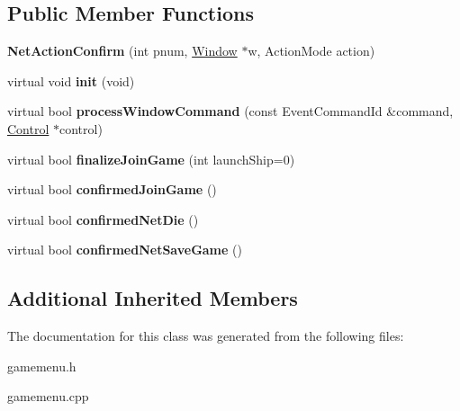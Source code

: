 \subsection*{Public Member Functions}
\begin{DoxyCompactItemize}
\item 
{\bfseries Net\+Action\+Confirm} (int pnum, \hyperlink{classWindow}{Window} $\ast$w, Action\+Mode action)\hypertarget{classNetActionConfirm_ac140d93e689becca599f60c30d4af493}{}\label{classNetActionConfirm_ac140d93e689becca599f60c30d4af493}

\item 
virtual void {\bfseries init} (void)\hypertarget{classNetActionConfirm_aed11586b8722c5949b94a37f154cb768}{}\label{classNetActionConfirm_aed11586b8722c5949b94a37f154cb768}

\item 
virtual bool {\bfseries process\+Window\+Command} (const Event\+Command\+Id \&command, \hyperlink{classControl}{Control} $\ast$control)\hypertarget{classNetActionConfirm_a70d4fcb462d82e7722a8a6f47eea91f2}{}\label{classNetActionConfirm_a70d4fcb462d82e7722a8a6f47eea91f2}

\item 
virtual bool {\bfseries finalize\+Join\+Game} (int launch\+Ship=0)\hypertarget{classNetActionConfirm_a7d10ecaa3e6597437d1bdf9a9680e93c}{}\label{classNetActionConfirm_a7d10ecaa3e6597437d1bdf9a9680e93c}

\item 
virtual bool {\bfseries confirmed\+Join\+Game} ()\hypertarget{classNetActionConfirm_a00eab556f3845d9bb295c396550bbb18}{}\label{classNetActionConfirm_a00eab556f3845d9bb295c396550bbb18}

\item 
virtual bool {\bfseries confirmed\+Net\+Die} ()\hypertarget{classNetActionConfirm_a8d04d389d34a82ba635f9a81df56a040}{}\label{classNetActionConfirm_a8d04d389d34a82ba635f9a81df56a040}

\item 
virtual bool {\bfseries confirmed\+Net\+Save\+Game} ()\hypertarget{classNetActionConfirm_ad84e2116779785a4f970a0ce6f9a716c}{}\label{classNetActionConfirm_ad84e2116779785a4f970a0ce6f9a716c}

\end{DoxyCompactItemize}
\subsection*{Additional Inherited Members}


The documentation for this class was generated from the following files\+:\begin{DoxyCompactItemize}
\item 
gamemenu.\+h\item 
gamemenu.\+cpp\end{DoxyCompactItemize}
